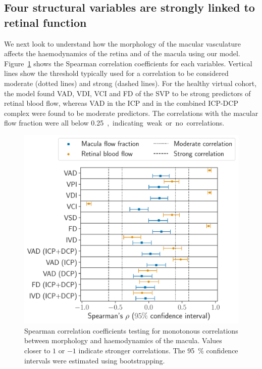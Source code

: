 \documentclass[11pt,]{article}
\begin{document}
\subsection{Four structural variables are strongly linked to retinal function}\label{sec:StructureAndFunction}

We next look to understand how the morphology of the macular vasculature affects the haemodynamics of the retina and of the macula using our model.
Figure~\ref{fig:SpearmanCorrelations} shows the Spearman correlation coefficients for each variables.
Vertical lines show the threshold typically used for a correlation to be considered moderate (dotted lines) and strong (dashed lines).
For the healthy virtual cohort, the model found VAD, VDI, VCI and FD of the SVP to be strong predictors of retinal blood flow, whereas VAD in the ICP and in the combined ICP-DCP complex were found to be moderate predictors.
The correlations with the macular flow fraction were all below \SI{0.25}, indicating weak or no correlations.

\begin{figure}[ht!]
  \centering
  \includegraphics[width=.95\textwidth]{SpearmanCoefficients}
  \caption{\label{fig:SpearmanCorrelations}Spearman correlation coefficients testing for monotonous correlations between morphology and haemodynamics of the macula. Values closer to $1$ or $-1$ indicate stronger correlations. The \SI{95}{\percent} confidence intervals were estimated using bootstrapping.}
\end{figure}
\end{document}
